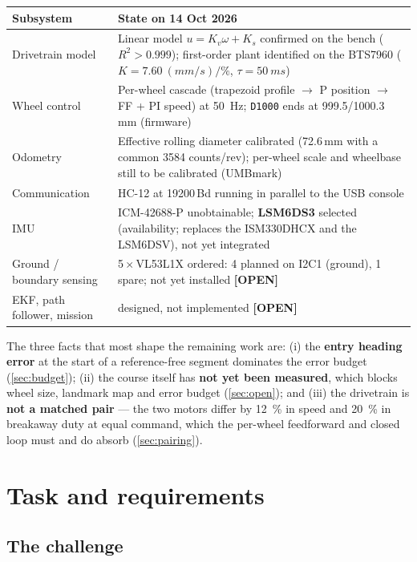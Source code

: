 \documentclass[11pt,a4paper]{article}
\newcommand{\mk}[2]{\textsf{\scriptsize\bfseries\colorbox{#1bg}{\color{#1}[#2]}}}
\newcommand{\OPEN}{\mk{grey}{OPEN}}
\newcommand{\code}[1]{\texttt{\small #1}}
\begin{document}
\begin{center}
\small
\begin{tabularx}{\textwidth}{@{}lL@{}}
\toprule
\textbf{Subsystem} & \textbf{State on 14 Oct 2026}\\
\midrule
Drivetrain model & Linear model $u=K_v\omega+K_s$ confirmed on the bench ($R^2>0.999$);
first-order plant identified on the BTS7960 ($K=\qty{7.60}{(mm/s)/\percent}$, $\tau=\qty{50}{ms}$)\\
Wheel control & Per-wheel cascade (trapezoid profile $\to$ P position $\to$ FF + PI speed) at \qty{50}{Hz};
\code{D1000} ends at 999.5/1000.3\,mm (firmware) \\
Odometry & Effective rolling diameter calibrated (72.6\,mm with a common 3584 counts/rev);
per-wheel scale and wheelbase still to be calibrated (UMBmark)\\
Communication & HC-12 at 19200\,Bd running in parallel to the USB console\\
IMU & ICM-42688-P unobtainable; \textbf{LSM6DS3} selected (availability; replaces the ISM330DHCX and the LSM6DSV), not yet integrated\\
Ground / boundary sensing & 5\,$\times$\,VL53L1X ordered: 4 planned on I2C1 (ground), 1 spare; not yet installed \OPEN\\
EKF, path follower, mission & designed, not implemented \OPEN\\
\bottomrule
\end{tabularx}
\end{center}

The three facts that most shape the remaining work are: (i) the \textbf{entry
heading error} at the start of a reference-free segment dominates the error
budget (\cref{sec:budget}); (ii) the course itself has \textbf{not yet been
measured}, which blocks wheel size, landmark map and error budget
(\cref{sec:open}); and (iii) the drivetrain is \textbf{not a matched pair} ---
the two motors differ by \qty{12}{\percent} in speed and \qty{20}{\percent} in
breakaway duty at equal command, which the per-wheel feedforward and closed loop
must and do absorb (\cref{sec:pairing}).

\clearpage
\section{Task and requirements}\label{sec:task}

\subsection{The challenge}
\end{document}

